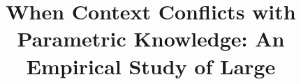 \documentclass[10pt,conference,a4paper]{IEEEtran}
\title{When Context Conflicts with Parametric Knowledge: An Empirical Study of Large}
\author{\IEEEauthorblockN{Anonymous Authors}}
\begin{document}
\maketitle{}

\begin{abstract}
	
\end{abstract}














% 


\end{document}
